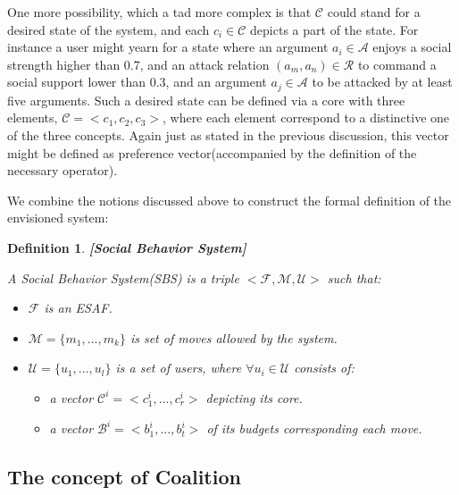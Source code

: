 \documentclass{article}
\newtheorem{definition}{Definition}
\begin{document}
One more possibility, which a tad more complex is that $\mathcal{C}$ could stand for a desired state of the system, and each $c_i \in \mathcal{C}$ depicts a part of the state. For instance a user might yearn for a state where an argument  $a_i \in \mathcal{A}$ enjoys a social strength higher than 0.7, and an attack relation $(a_m, a_n) \in \mathcal{R}$  to command a social support lower than 0.3,  and an argument $a_j \in \mathcal{A}$ to be attacked by at least five arguments. Such a desired state can be defined via a core with three elements, $\mathcal{C} = <c_1, c_2, c_3>$, where each element correspond to a distinctive one of the three concepts. Again just as stated in the previous discussion, this vector might be defined as preference vector(accompanied by the definition of the necessary operator).

We combine the notions discussed above to construct the formal definition of the envisioned system:

\begin{definition}\textbf{[Social Behavior System]}

A Social Behavior System(SBS) is a triple $<\mathcal{F}, \mathcal{M}, \mathcal{U}>$ such that:

\begin{itemize}
\item $\mathcal{F}$ is an ESAF.
\item  $\mathcal{M} = \{m_1, ..., m_k\}$ is set of moves allowed by the system.
\item $\mathcal{U} = \{u_1, ..., u_l\} $ is a set of users, where $\forall u_i \in \mathcal{U}$ consists of:
\begin{itemize}
\item a vector $\mathcal{C}^i = <c_1^i, ..., c_r^i>$ depicting its core.
\item a vector $\mathcal{B}^i = <b_1^i, ..., b_t^i>$ of its budgets corresponding each move. 
\end{itemize}
\end{itemize}

\end{definition}

\subsection{The concept of Coalition}
\end{document}
